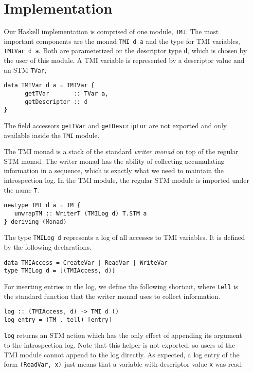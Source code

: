 \section{Implementation}
\label{sec:implementation}

Our Haskell implementation is comprised of one module, \verb+TMI+. 
The most important components are the
monad \lstinline+TMI d a+ and the type for TMI variables, \lstinline+TMIVar d a+. 
Both are parameterized on the descriptor type \lstinline+d+, which is chosen by the user
of this module. A TMI variable is represented by a descriptor value and an STM \lstinline+TVar+,
\begin{lstlisting}[style=small]
data TMIVar d a = TMIVar {
      getTVar       :: TVar a,
      getDescriptor :: d
}
\end{lstlisting}
The field accessors \lstinline+getTVar+ and \lstinline+getDescriptor+ are not exported and
only available inside the \lstinline+TMI+ module.

The TMI monad is a stack of the standard {\em writer monad} on top of the regular STM
monad. The writer monad has the ability of collecting accumulating information in a
sequence, which is exactly what we need to maintain the introspection log.
In the TMI module, the regular STM module is imported under the name \lstinline+T+.
\begin{lstlisting}[style=small]
newtype TMI d a = TM {
   unwrapTM :: WriterT (TMILog d) T.STM a
} deriving (Monad)
\end{lstlisting}
The type \lstinline+TMILog d+ represents a log of all accesses to TMI variables.
It is defined by the following declarations.
\begin{lstlisting}[style=small]
data TMIAccess = CreateVar | ReadVar | WriteVar
type TMILog d = [(TMIAccess, d)]
\end{lstlisting}
For inserting entries in the log, we define the following shortcut, where \lstinline+tell+
is the standard function that the writer monad uses to collect information.
\begin{lstlisting}[style=small]
log :: (TMIAccess, d) -> TMI d ()
log entry = (TM . tell) [entry]
\end{lstlisting}
\lstinline+log+ returns an STM action which has the
only effect of appending its argument to the introspection log. Note that this
helper is not exported, so users of the TMI module cannot append to the log
directly.
As expected, a log entry of the form \lstinline+(ReadVar, x)+ just means that a variable with descriptor
value \lstinline+x+ was read. 

